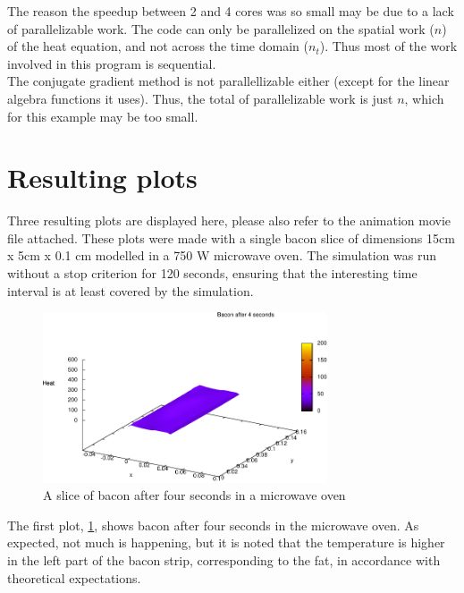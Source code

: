 The reason the speedup between 2 and 4 cores was so small may be due to a lack of
parallelizable work. The code can only be parallelized on the spatial work ($n$) of the
heat equation, and not across the time domain ($n_t$). Thus most of the work involved in
this program is sequential. \\

The conjugate gradient method is not parallellizable either (except for the linear algebra functions it
uses). Thus, the total of parallelizable work is just $n$, which for this example may be too small.

\section{Resulting plots}
Three resulting plots are displayed here, please also refer to the animation
movie file attached. These plots were made with a single bacon slice of
dimensions 15cm x 5cm x 0.1 cm modelled in a 750 W microwave oven. The
simulation was run without a stop criterion for 120 seconds, ensuring that the
interesting time interval is at least covered by the simulation. \\

\begin{figure}[!h]
  \begin{center}
    \includegraphics[width=0.75\textwidth]{bacon-4sec.pdf}
  \end{center}
  \caption{A slice of bacon after four seconds in a microwave oven}
  \label{fig:bacon-4sec}
\end{figure}

The first plot, \cref{fig:bacon-4sec}, shows bacon after four seconds in the microwave oven. As
expected, not much is happening, but it is noted that the temperature is higher
in the left part of the bacon strip, corresponding to the fat, in accordance
with theoretical expectations.\\

